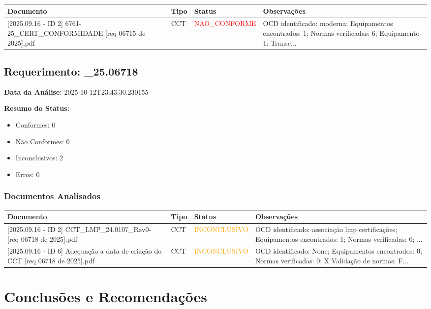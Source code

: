 \documentclass[12pt,a4paper]{article}
\begin{document}
\begin{longtable}{|p{4cm}|p{2cm}|p{2cm}|p{6cm}|}
\hline
\textbf{Documento} & \textbf{Tipo} & \textbf{Status} & \textbf{Observações} \\
\hline
\endhead
[Certificado de Conformidade Técnica - CCT][2025.09.16 - ID 2] 6761-25\_CERT\_CONFORMIDADE [req 06715 de  2025].pdf & CCT & \textcolor{red}{NAO\_CONFORME} & OCD identificado: moderna; Equipamentos encontrados: 1; Normas verificadas: 6; Equipamento 1: Transc... \\
\hline
\end{longtable}


\subsection{Requerimento: \_25.06718}

\textbf{Data da Análise:} 2025-10-12T23:43:30.230155

\textbf{Resumo do Status:}
\begin{itemize}
    \item Conformes: 0
    \item Não Conformes: 0
    \item Inconclusivos: 2
    \item Erros: 0
\end{itemize}

\subsubsection{Documentos Analisados}

\begin{longtable}{|p{4cm}|p{2cm}|p{2cm}|p{6cm}|}
\hline
\textbf{Documento} & \textbf{Tipo} & \textbf{Status} & \textbf{Observações} \\
\hline
\endhead
[Certificado de Conformidade Técnica - CCT][2025.09.16 - ID 2] CCT\_LMP\_24.0107\_Rev0- [req 06718 de  2025].pdf & CCT & \textcolor{orange}{INCONCLUSIVO} & OCD identificado: associação lmp certificações; Equipamentos encontrados: 1; Normas verificadas: 0; ... \\
\hline
[Outros (OCD)][2025.09.16 - ID 6] Adequação a data de criação do CCT [req 06718 de  2025].pdf & CCT & \textcolor{orange}{INCONCLUSIVO} & OCD identificado: None; Equipamentos encontrados: 0; Normas verificadas: 0; X Validação de normas: F... \\
\hline
\end{longtable}


\section{Conclus\~oes e Recomenda\c{c}\~oes}
\end{document}
